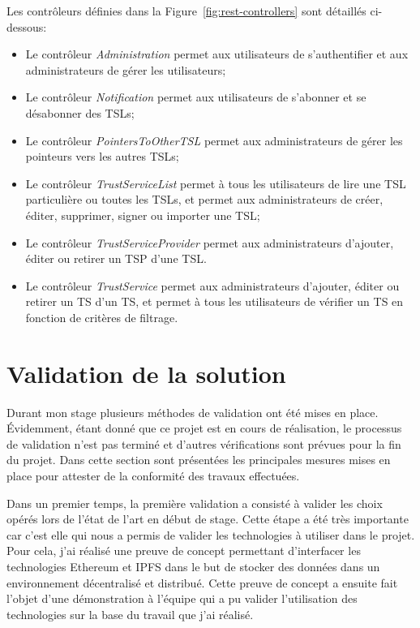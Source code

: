 \documentclass{tnreport}
\begin{document}
Les contrôleurs définies dans la Figure~\ref{fig:rest-controllers} sont détaillés ci-dessous:
\begin{itemize}
	\item Le contrôleur \textit{Administration} permet aux utilisateurs de s'authentifier et aux administrateurs de gérer les utilisateurs;
	\item Le contrôleur \textit{Notification} permet aux utilisateurs de s'abonner et se désabonner des TSLs;
	\item Le contrôleur \textit{PointersToOtherTSL} permet aux administrateurs de gérer les pointeurs vers les autres TSLs;
	\item Le contrôleur \textit{TrustServiceList} permet à tous les utilisateurs de lire une TSL particulière ou toutes les TSLs, et permet aux administrateurs de créer, éditer, supprimer, signer ou importer une TSL;
	\item Le contrôleur \textit{TrustServiceProvider} permet aux administrateurs d'ajouter, éditer ou retirer un TSP d'une TSL.
	\item Le contrôleur \textit{TrustService} permet aux administrateurs d'ajouter, éditer ou retirer un TS d'un TS, et permet à tous les utilisateurs de vérifier un TS en fonction de critères de filtrage.
\end{itemize}

\section{Validation de la solution}

Durant mon stage plusieurs méthodes de validation ont été mises en place. Évidemment, étant
donné que ce projet est en cours de réalisation, le processus de validation n'est pas terminé et d'autres vérifications sont prévues pour la fin du projet. Dans cette section sont présentées les principales mesures mises en place pour attester de la conformité des travaux effectuées.

Dans un premier temps, la première validation a consisté à valider les choix opérés lors de l'état de l'art en début de stage. Cette étape a été très importante car c'est elle qui nous a permis de valider les technologies à utiliser dans le projet. Pour cela, j'ai réalisé une preuve de concept permettant d'interfacer les technologies Ethereum et IPFS dans le but de stocker des données dans un environnement décentralisé et distribué. Cette preuve de concept a ensuite fait l'objet d'une démonstration à l'équipe qui a pu valider l'utilisation des technologies sur la base du travail que j'ai réalisé.
\end{document}
